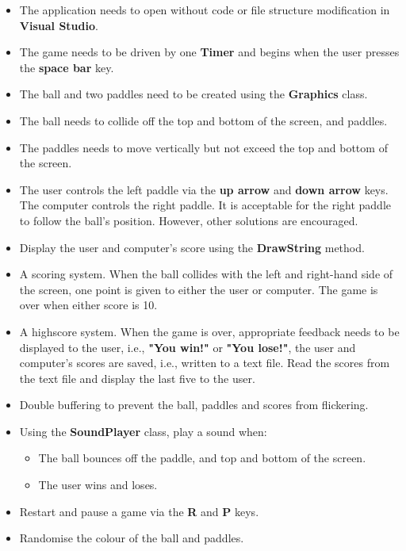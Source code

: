 \documentclass{article}
\begin{document}
\begin{itemize}
    \item The application needs to open without code or file structure modification in \textbf{Visual Studio}.
    \item The game needs to be driven by one \textbf{Timer} and begins when the user presses the \textbf{space bar} key.
    \item The ball and two paddles need to be created using the \textbf{Graphics} class. 
    \item The ball needs to collide off the top and bottom of the screen, and paddles.
    \item The paddles needs to move vertically but not exceed the top and bottom of the screen.
    \item The user controls the left paddle via the \textbf{up arrow} and \textbf{down arrow} keys. The computer controls the right paddle. It is acceptable for the right paddle to follow the ball's position. However, other solutions are encouraged.
    \item Display the user and computer's score using the \textbf{DrawString} method.
    \item A scoring system. When the ball collides with the left and right-hand side of the screen, one point is given to either the user or computer. The game is over when either score is 10. 
    \item A highscore system. When the game is over, appropriate feedback needs to be displayed to the user, i.e., \textbf{"You win!"} or \textbf{"You lose!"}, the user and computer's scores are saved, i.e., written to a text file. Read the scores from the text file and display the last five to the user.
    \item Double buffering to prevent the ball, paddles and scores from flickering.
    \item Using the \textbf{SoundPlayer} class, play a sound when:
    \begin{itemize}
        \item The ball bounces off the paddle, and top and bottom of the screen.
        \item The user wins and loses.
    \end{itemize}
    \item Restart and pause a game via the \textbf{R} and \textbf{P} keys.
    \item Randomise the colour of the ball and paddles.
\end{itemize}
\end{document}
